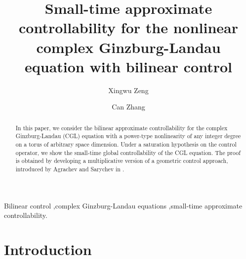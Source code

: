 \documentclass[review]{elsarticle}
\theoremstyle{dotless}
\numberwithin{equation}{section}
\begin{document}
	
\begin{frontmatter}
	
	\title{Small-time approximate controllability for the nonlinear complex Ginzburg-Landau equation with bilinear control}
	
	
	
	
	\medskip
	
	\author[my3address]{Xingwu Zeng}%
	
	\author[my3address]{Can Zhang}%

\address[my3address]{School of Mathematics and Statistics, Wuhan University, Wuhan 430072, China.}


	\begin{abstract}
		In this paper, we consider the bilinear approximate controllability for  the complex Ginzburg-Landau (CGL) equation with a power-type nonlinearity of any integer degree on a torus of  arbitrary space dimension. Under a saturation hypothesis on the control operator, we show  the small-time global controllability of the CGL equation. The proof is obtained by developing a multiplicative version of a geometric control approach, introduced by Agrachev and Sarychev in \cite{AS05,AS06}.
	\end{abstract}
	
	\begin{keyword}
		Bilinear control \sep complex Ginzburg-Landau equations \sep small-time  approximate controllability.
	\end{keyword}
\end{frontmatter}



\section{Introduction}
\end{document}

